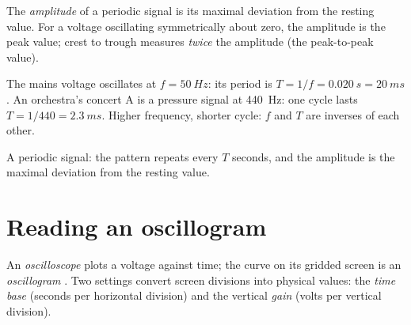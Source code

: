 \begin{definition}[Amplitude]\label{def:g10:signals-and-waves:amplitude}
The \emph{amplitude} of a periodic signal is its maximal
deviation from the resting value. For a voltage oscillating symmetrically
about zero, the amplitude is the peak value; crest to trough measures
\emph{twice} the amplitude (the peak-to-peak value).
\end{definition}

\begin{example}\label{ex:g10:signals-and-waves:mains}
The mains voltage oscillates at $f = \qty{50}{Hz}$: its period is
$T = 1/f = \qty{0.020}{s} = \qty{20}{ms}$. An orchestra's concert A is a
pressure signal at \qty{440}{Hz}: one cycle lasts
$T = 1/440 = \qty{2.3}{ms}$. Higher frequency, shorter cycle: $f$ and $T$
are inverses of each other.
\end{example}

\begin{omfigure}

{\small A periodic signal: the pattern repeats every $T$ seconds, and the
amplitude is the maximal deviation from the resting value.}
\end{omfigure}

\section{Reading an oscillogram}

\begin{definition}[Oscilloscope]\label{def:g10:signals-and-waves:oscilloscope}
An \emph{oscilloscope} plots a voltage against time;
the curve on its gridded screen is an \emph{oscillogram}%
. Two settings convert screen divisions into physical
values: the \emph{time base} (seconds per horizontal
division) and the vertical \emph{gain} (volts per vertical
division).
\end{definition}

